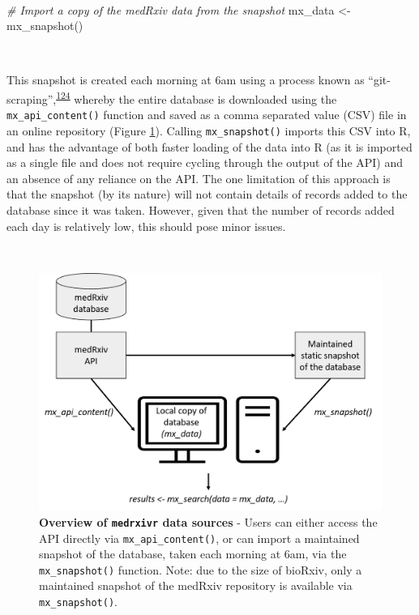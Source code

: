 \documentclass[a4paper, twoside]{templates/ociamthesis}
\newenvironment{Shaded}{\begin{snugshade}}{\end{snugshade}}
\newcommand{\CommentTok}[1]{\textcolor[rgb]{0.56,0.35,0.01}{\textit{#1}}}
\newcommand{\FunctionTok}[1]{\textcolor[rgb]{0.00,0.00,0.00}{#1}}
\newcommand{\NormalTok}[1]{#1}
\newcommand{\OtherTok}[1]{\textcolor[rgb]{0.56,0.35,0.01}{#1}}
\renewenvironment{Shaded}
{
  \vspace{4pt}%
  \begin{snugshade}%
}{%
  \end{snugshade}%
  \vspace{4pt}%
}
\begin{document}
~

\begin{Shaded}
\begin{Highlighting}[]
\CommentTok{\# Import a copy of the medRxiv data from the snapshot}
\NormalTok{mx\_data }\OtherTok{\textless{}{-}} \FunctionTok{mx\_snapshot}\NormalTok{()}
\end{Highlighting}
\end{Shaded}

~

This snapshot is created each morning at 6am using a process known as ``git-scraping'',\textsuperscript{\protect\hyperlink{ref-zotero-15031}{124}} whereby the entire database is downloaded using the \texttt{mx\_api\_content()} function and saved as a comma separated value (CSV) file in an online repository (Figure \ref{fig:medrxivr-data-sources}). Calling \texttt{mx\_snapshot()} imports this CSV into R, and has the advantage of both faster loading of the data into R (as it is imported as a single file and does not require cycling through the output of the API) and an absence of any reliance on the API. The one limitation of this approach is that the snapshot (by its nature) will not contain details of records added to the database since it was taken. However, given that the number of records added each day is relatively low, this should pose minor issues.

~





\begin{figure}[H]
\includegraphics[width=1\linewidth]{figures/sys-rev-tools/data_sources} \caption[Overview of \texttt{medrxivr} data sources]{\textbf{Overview of \texttt{medrxivr} data sources} - Users can either access the API directly via \texttt{mx\_api\_content()}, or can import a maintained snapshot of the database, taken each morning at 6am, via the \texttt{mx\_snapshot()} function. Note: due to the size of bioRxiv, only a maintained snapshot of the medRxiv repository is available via \texttt{mx\_snapshot()}.}\label{fig:medrxivr-data-sources}
\end{figure}
\end{document}
